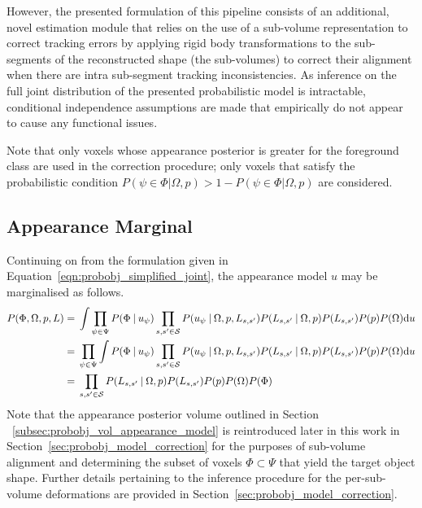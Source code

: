 However, the presented formulation of this pipeline consists of an
additional, novel estimation module that relies on the use of a sub-volume
representation to correct tracking errors by applying rigid body transformations
to the sub-segments of the reconstructed shape (the sub-volumes) to correct their
alignment when there are intra sub-segment tracking inconsistencies. As inference
on the full joint distribution of the presented probabilistic model is intractable, 
conditional independence assumptions are made that empirically do not appear to 
cause any functional issues. 

Note that only voxels whose appearance posterior is greater for the foreground 
class are used in the correction procedure; only voxels that satisfy the probabilistic 
condition \(P(\psi \in \Phi | \Omega, p) > 1 - P(\psi \in \Phi | \Omega, p)\) are 
considered.

\subsection{Appearance Marginal}
Continuing on from the formulation given in Equation~\ref{eqn:probobj_simplified_joint}, 
the appearance model \(u\) may be marginalised as follows.
\begin{align}
  \label{eqn:probobj_appearance_marginal}
  P(\Phi, \Omega, p, L) ={}&
  \int
  \prod_{\psi \in \Psi} P(\Phi \:\vert\: u_{\psi})
  \prod_{s, s' \in \mathcal{S}}P(u_{\psi} \:\vert\: \Omega, p, L_{s, s'})
  P(L_{s, s'} \:\vert\: \Omega, p) P(L_{s, s'})P(p)P(\Omega) {\mathrm d{u}} \\
  ={}& \prod_{\psi \in \Psi} 
  \int P(\Phi \:\vert\: u_{\psi})
  \prod_{s, s' \in \mathcal{S}}P(u_{\psi} \:\vert\: \Omega, p, L_{s, s'})
  P(L_{s, s'} \:\vert\: \Omega, p) P(L_{s, s'})P(p)P(\Omega) {\mathrm d{u}} \\
  ={}& \prod_{s, s' \in \mathcal{S}} P(L_{s, s'} \:\vert\: \Omega, p)
  P(L_{s, s'})P(p)P(\Omega)P(\Phi)
\end{align}
Note that the appearance posterior volume outlined in Section
~\ref{subsec:probobj_vol_appearance_model} is reintroduced later in this work in
Section~\ref{sec:probobj_model_correction} for the purposes of sub-volume alignment 
and determining the subset of voxels \( \Phi \subset \Psi \) that yield the 
target object shape. Further details pertaining to the inference procedure for the 
per-sub-volume deformations are provided in Section~\ref{sec:probobj_model_correction}.


